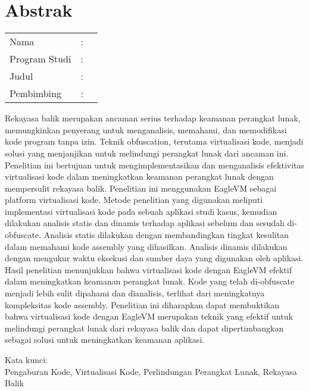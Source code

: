 %
%
%

\chapter*{Abstrak}

\vspace*{0.2cm}
{
	\setlength{\parindent}{0pt}

	\begin{tabular}{@{}l l p{10cm}}
		Nama          & : & \penulis    \\
		Program Studi & : & \program    \\
		Judul         & : & \judul      \\
		Pembimbing    & : & \pembimbing \\
	\end{tabular}

	\bigskip
	\bigskip

Rekayasa balik merupakan ancaman serius terhadap keamanan perangkat lunak, memungkinkan penyerang untuk menganalisis, memahami, dan memodifikasi kode program tanpa izin. Teknik obfuscation, terutama virtualisasi kode, menjadi solusi yang menjanjikan untuk melindungi perangkat lunak dari ancaman ini. Penelitian ini bertujuan untuk mengimplementasikan dan menganalisis efektivitas virtualisasi kode dalam meningkatkan keamanan perangkat lunak dengan mempersulit rekayasa balik. Penelitian ini menggunakan EagleVM sebagai platform virtualisasi kode. Metode penelitian yang digunakan meliputi implementasi virtualisasi kode pada sebuah aplikasi studi kasus, kemudian dilakukan analisis statis dan dinamis terhadap aplikasi sebelum dan sesudah di-obfuscate. Analisis statis dilakukan dengan membandingkan tingkat kesulitan dalam memahami kode assembly yang dihasilkan. Analisis dinamis dilakukan dengan mengukur waktu eksekusi dan sumber daya yang digunakan oleh aplikasi. Hasil penelitian menunjukkan bahwa virtualisasi kode dengan EagleVM efektif dalam meningkatkan keamanan perangkat lunak. Kode yang telah di-obfuscate menjadi lebih sulit dipahami dan dianalisis, terlihat dari meningkatnya kompleksitas kode assembly. Penelitian ini diharapkan dapat membuktikan bahwa virtualisasi kode dengan EagleVM merupakan teknik yang efektif untuk melindungi perangkat lunak dari rekayasa balik dan dapat dipertimbangkan sebagai solusi untuk meningkatkan keamanan aplikasi.

	\bigskip

	Kata kunci:\\
	Pengaburan Kode, Virtualisasi Kode, Perlindungan Perangkat Lunak, Rekayasa Balik
}

\newpage

